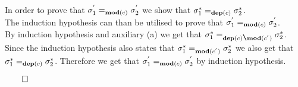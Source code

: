 \documentclass[12pt]{scrartcl}
\newcommand{\Mod}[0]{\text{\textbf{mod}}}
\newcommand{\dep}[0]{\text{\textbf{dep}}}
\begin{document}
	\indent\indent In order to prove that $\sigma^{'}_{1}=_{\text{\textbf{mod}}(c)}\sigma^{'}_{2}$ we show that $\sigma^{*}_{1}=_{\dep(c)}\sigma^{*}_{2}$.\\\indent\indent The induction hypothesis can than be utilised to prove that $\sigma^{'}_{1}=_{\Mod(c)}\sigma^{'}_{2}$.\\
	\indent\indent By induction hypothesis and auxiliary (a) we get that $\sigma^{*}_{1}=_{\dep(c)\verb|\|\Mod(c^{'})}\sigma^{*}_{2}$. \indent\indent Since the induction hypothesis also states that $\sigma^{*}_{1}=_{\Mod(c^{'})}\sigma^{*}_{2}$ we also get that \indent\indent $\sigma^{*}_{1}=_{\dep(c)}\sigma^{*}_{2}$. Therefore we get that $\sigma^{'}_{1}=_{\Mod(c)}\sigma^{'}_{2}$ by induction hypothesis.
	\begin{flushright}
	$\qed$
	\end{flushright}
	
\end{document}
